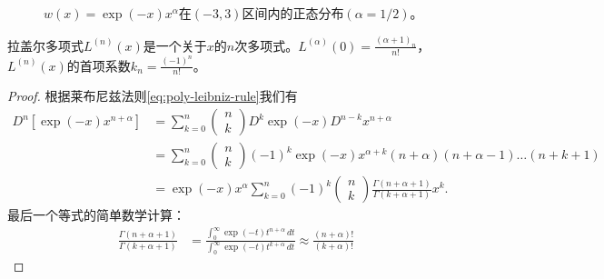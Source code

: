 \begin{subappendices}
\begin{figure}[htbp]
\small{$w(x) = \exp(-x) x^{\alpha}$在$(-3,3)$区间内的正态分布$(\alpha = 1/2)$。}
\end{figure}

\begin{theorem}
  拉盖尔多项式$L^{(n)}(x)$是一个关于$x$的$n$次多项式。$L^{(\alpha)}(0) = \frac{(\alpha+1)_n}{n!}$，$L^{(n)}(x)$的首项系数$k_n = \frac{(-1)^n}{n!}$。
\end{theorem}
\begin{proof}
  根据莱布尼兹法则\eqref{eq:poly-leibniz-rule}我们有
  \begin{equation*}
    \begin{split}
      D^n \left[ \exp(-x) x^{n+\alpha} \right] &= \sum_{k=0}^n \begin{pmatrix} n \\ k \end{pmatrix} D^k \exp(-x) D^{n-k} x^{n+\alpha} \\
      &= \sum_{k=0}^{n} \begin{pmatrix} n \\ k \end{pmatrix} (-1)^k \exp(-x) x^{\alpha + k }(n+\alpha)(n+\alpha-1) \ldots (n + k + 1) \\
      &= \exp(-x) x^{\alpha}  \sum_{k=0}^{n} (-1)^k \begin{pmatrix} n \\ k \end{pmatrix} \frac{\Gamma (n+\alpha + 1)}{\Gamma (k + \alpha + 1)} x^k.
    \end{split}
  \end{equation*}
最后一个等式的简单数学计算：
\begin{equation*}
  \begin{split}
    \frac{\Gamma (n+\alpha + 1)}{\Gamma (k + \alpha + 1)} &= \frac{
    \int_0^{\infty} \exp(-t) t^{n+\alpha} \, dt
    }{
    \int_0^{\infty} \exp(-t) t^{k+\alpha} \, dt
    } \approx \frac{(n+\alpha)!}{(k+\alpha)!}
  \end{split}
\end{equation*}


\end{proof}
\end{subappendices}
